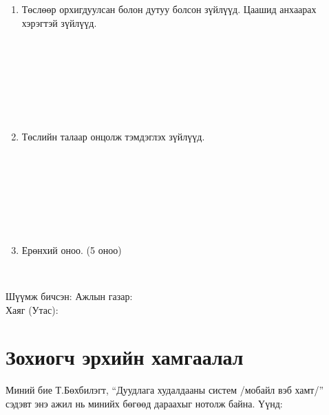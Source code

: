 \documentclass[12pt, a4paper]{report}
\newcommand{\thesistitle}{Дуудлага худалдааны систем /мобайл вэб хамт/}
\newcommand{\authorshort}{Т.Бөхбилэгт}
\begin{document}
\begin{titlepage}
\begin{enumerate}
\item Төслөөр орхигдуулсан болон дутуу болсон зүйлүүд. Цаашид анхаарах хэрэгтэй зүйлүүд.
\begin{center}
\dotfill \\[0.1cm] \dotfill \\[0.1cm] \dotfill \\[0.1cm]
\dotfill \\[0.1cm] \dotfill \\[0.1cm] \dotfill \\[0.4cm]
\end{center}

\item Төслийн талаар онцолж тэмдэглэх зүйлүүд.
\begin{center}
\dotfill \\[0.1cm] \dotfill \\[0.1cm] \dotfill \\[0.1cm]
\dotfill \\[0.1cm] \dotfill \\[0.1cm] \dotfill \\[0.4cm]
\end{center}

\item Ерөнхий оноо. (5 оноо)
\begin{center}
\dotfill \\[1cm]
\end{center}
\end{enumerate}

Шүүмж бичсэн: \makebox[3cm]{\dotfill} \hspace{1cm} Ажлын газар: \dotfill \\[0.5cm]
Хаяг (Утас): \makebox[5cm]{\dotfill}

\end{titlepage}

\chapter*{Зохиогч эрхийн хамгаалал}
\thispagestyle{plain}

\noindent Миний бие \authorshort, ``{\thesistitle}'' сэдэвт энэ ажил нь минийх бөгөөд
дараахыг нотолж байна. Үүнд:
\end{document}
